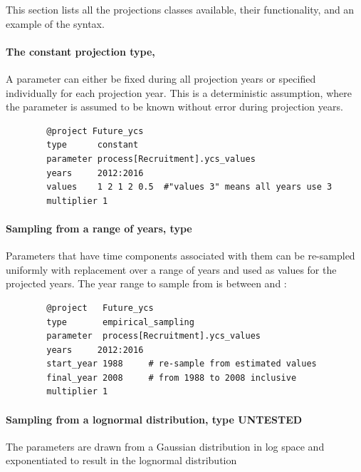 This section lists all the projections classes available, their functionality, and an example of the syntax.

\paragraph[Constant]{The constant projection type, }

A parameter can either be fixed during all projection years or specified individually for each projection year. This is a deterministic assumption, where the parameter is assumed to be known without error during projection years.

{\small{\begin{verbatim}
		@project Future_ycs
		type      constant
		parameter process[Recruitment].ycs_values
		years     2012:2016
		values    1 2 1 2 0.5  #"values 3" means all years use 3
		multiplier 1
		\end{verbatim}}}

\paragraph[Empirical resampling]{Sampling from a range of years, type  }

Parameters that have time components associated with them can be re-sampled uniformly with replacement over a range of years and used as values for the projected years. The year range to sample from is between  and :

{\small{\begin{verbatim}
		@project   Future_ycs
		type       empirical_sampling
		parameter  process[Recruitment].ycs_values
		years     2012:2016
		start_year 1988     # re-sample from estimated values
		final_year 2008     # from 1988 to 2008 inclusive
		multiplier 1
		\end{verbatim}}}


\paragraph[Lognormal]{Sampling from a lognormal distribution, type   UNTESTED}

The parameters are drawn from a Gaussian distribution in log space and exponentiated  to result in the lognormal distribution

